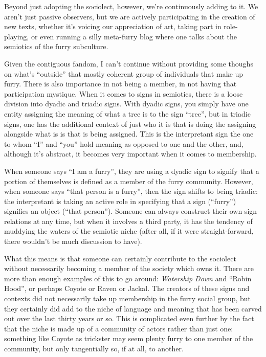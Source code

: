 Beyond just adopting the sociolect, however, we're continuously adding
to it. We aren't just passive observers, but we are actively
participating in the creation of new texts, whether it's voicing our
appreciation of art, taking part in role-playing, or even running a
silly meta-furry blog where one talks about the semiotics of the furry
subculture.

Given the contiguous fandom, I can't continue without providing some
thoughs on what's ``outside'' that mostly coherent group of individuals
that make up furry. There is also importance in not being a member, in
not having that participation mystique. When it comes to signs in
semiotics, there is a loose division into dyadic and triadic signs. With
dyadic signs, you simply have one entity assigning the meaning of what a
tree is to the sign ``tree'', but in triadic signs, one has the
additional context of just who it is that is doing the assigning
alongside what is is that is being assigned. This is the interpretant
sign the one to whom ``I'' and ``you'' hold meaning as opposed to one
and the other, and, although it's abstract, it becomes very important
when it comes to membership.

When someone says ``I am a furry'', they are using a dyadic sign to
signify that a portion of themselves is defined as a member of the furry
community. However, when someone says ``that person is a furry'', then
the sign shifts to being triadic: the interpretant is taking an active
role in specifying that a sign (``furry'') signifies an object (``that
person''). Someone can always construct their own sign relations at any
time, but when it involves a third party, it has the tendency of
muddying the waters of the semiotic niche (after all, if it were
straight-forward, there wouldn't be much discussion to have).

What this means is that someone can certainly contribute to the
sociolect without necessarily becoming a member of the society which
owns it. There are more than enough examples of this to go around:
\emph{Watership Down} and ``Robin Hood'', or perhaps Coyote or Raven or
Jackal. The creators of these signs and contexts did not necessarily
take up membership in the furry social group, but they certainly did add
to the niche of language and meaning that has been carved out over the
last thirty years or so. This is complicated even further by the fact
that the niche is made up of a community of actors rather than just one:
something like Coyote as trickster may seem plenty furry to one member
of the community, but only tangentially so, if at all, to another.

